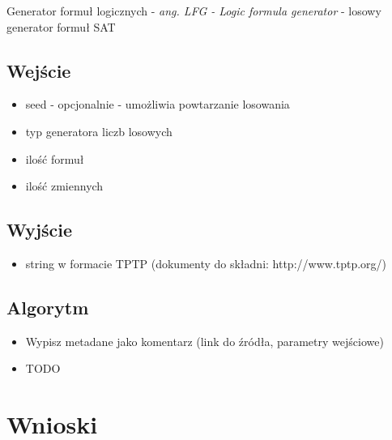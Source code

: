 \documentclass[a4paper,12pt]{article}
\begin{document}
Generator formuł logicznych - \textit{ang. LFG - Logic formula generator} - losowy generator formuł SAT

\subsection{Wejście}

\begin{itemize}
  \item seed - opcjonalnie - umożliwia powtarzanie losowania
  \item typ generatora liczb losowych
  \item ilość formuł
  \item ilość zmiennych
\end{itemize}

\subsection{Wyjście}

\begin{itemize}
  \item string w formacie TPTP (dokumenty do składni: http://www.tptp.org/)
\end{itemize}

\subsection{Algorytm}
\begin{itemize}
  \item Wypisz metadane jako komentarz (link do źródła, parametry wejściowe)
  \item TODO
\end{itemize}

\section{Wnioski}
\lipsum[1]

\printglossary
\end{document}

